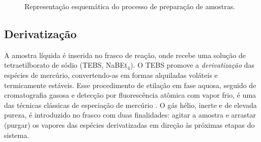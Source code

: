 \begin{figure}[htbp]
\centering
{}
\caption{Representa\c{c}\~ao esquem\'atica do processo de prepara\c{c}\~ao de amostras.}
\label{fig:processo}
\par{}
\end{figure}

\subsection{Derivatiza\c{c}\~ao}

A amostra l\'iquida \'e inserida no frasco de rea\c{c}\~ao, onde recebe uma
solu\c{c}\~ao de tetraetilborato de s\'odio (TEBS, NaBEt$_4$). O TEBS promove a
\emph{derivatiza\c{c}\~ao} das esp\'ecies de merc\'urio, convertendo-as em
formas alquiladas vol\'ateis e termicamente est\'aveis. Esse procedimento de
etila\c{c}\~ao em fase aquosa, seguido de cromatografia gasosa e detec\c{c}\~ao
por fluoresc\^encia at\^omica com vapor frio, \'e uma das t\'ecnicas cl\'assicas
de especia\c{c}\~ao de merc\'urio \cite{bloom1989, liang1994}. O g\'as h\'elio,
inerte e de elevada pureza, \'e introduzido no frasco com duas finalidades:
agitar a amostra e arrastar (purgar) os vapores das esp\'ecies derivatizadas em
dire\c{c}\~ao \`as pr\'oximas etapas do sistema.


